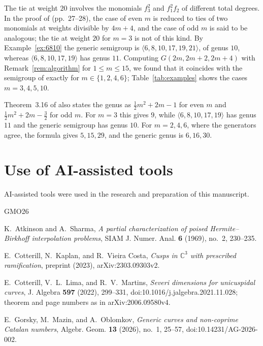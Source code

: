 \documentclass{amsart}
\theoremstyle{definition}
\numberwithin{equation}{section}
\newcommand{\C}{\mathbb{C}}
\newcommand{\gen}[1]{\langle #1\rangle}
\begin{document}
The tie at weight $20$ involves the monomials $f_3^2$ and $f_1^2f_2$ of
different total degrees. In the proof of \cite[Theorem~3.16]{CLM} (pp.~27--28), the
case of even $m$ is reduced to ties of two monomials at weights divisible by
$4m+4$, and the case of odd $m$ is said to be analogous; the tie at weight
$20$ for $m=3$ is not of this kind. By Example~\ref{ex:6810} the generic
semigroup is $\gen{6,8,10,17,19,21}$, of genus $10$, whereas
$\gen{6,8,10,17,19}$ has genus $11$. Computing $G(2m,2m+2,2m+4)$ with
Remark~\ref{rem:algorithm} for $1\le m\le15$, we found that it coincides with
the semigroup of \cite[Theorem~3.16]{CLM} exactly for $m\in\{1,2,4,6\}$;
Table~\ref{tab:examples} shows the cases $m=3,4,5,10$.

Theorem~3.16 of \cite{CLM} also states the genus as \mbox{$\frac12m^2+2m-1$}
for even $m$ and \mbox{$\frac12m^2+2m-\frac32$} for odd $m$. For $m=3$ this gives $9$, while
$\gen{6,8,10,17,19}$ has genus $11$ and the generic semigroup has genus $10$.
For $m=2,4,6$, where the generators agree, the formula gives $5,15,29$, and the
generic genus is $6,16,30$.

\section*{Use of AI-assisted tools}
AI-assisted tools were used in the research and preparation of this manuscript.

\begin{thebibliography}{GMO26}

K.~Atkinson and A.~Sharma, \emph{A partial characterization of poised
Hermite--Birkhoff interpolation problems}, SIAM J. Numer. Anal. \textbf{6}
(1969), no.~2, 230--235.

E.~Cotterill, N.~Kaplan, and R.~Vieira Costa, \emph{Cusps in $\C^3$ with
prescribed ramification}, preprint (2023), arXiv:2303.09303v2.

E.~Cotterill, V.~L.~Lima, and R.~V.~Martins, \emph{Severi dimensions for
unicuspidal curves}, J. Algebra \textbf{597} (2022), 299--331,
doi:10.1016/j.jalgebra.2021.11.028; theorem and page numbers as in
arXiv:2006.09580v4.

E.~Gorsky, M.~Mazin, and A.~Oblomkov, \emph{Generic curves and non-coprime
Catalan numbers}, Algebr. Geom. \textbf{13} (2026), no.~1, 25--57,
doi:10.14231/AG-2026-002.

\end{thebibliography}
\end{document}
